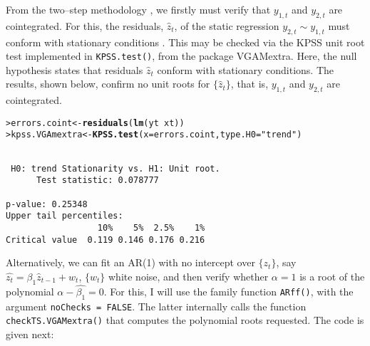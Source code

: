\documentclass[a4paper, 11pt]{article}\usepackage[]{graphicx}\usepackage[]{color}
\makeatletter
\newcommand{\hlstr}[1]{\textcolor[rgb]{0.192,0.494,0.8}{#1}}%
\newcommand{\hlopt}[1]{\textcolor[rgb]{0,0,0}{#1}}%
\newcommand{\hlstd}[1]{\textcolor[rgb]{0.345,0.345,0.345}{#1}}%
\newcommand{\hlkwb}[1]{\textcolor[rgb]{0.69,0.353,0.396}{#1}}%
\newcommand{\hlkwc}[1]{\textcolor[rgb]{0.333,0.667,0.333}{#1}}%
\newcommand{\hlkwd}[1]{\textcolor[rgb]{0.737,0.353,0.396}{\textbf{#1}}}%
\newenvironment{kframe}{%
 \def\at@end@of@kframe{}%
 \ifinner\ifhmode%
  \def\at@end@of@kframe{\end{minipage}}%
  \begin{minipage}{\columnwidth}%
 \fi\fi%
 \def\FrameCommand##1{\hskip\@totalleftmargin \hskip-\fboxsep
 \colorbox{shadecolor}{##1}\hskip-\fboxsep
     \hskip-\linewidth \hskip-\@totalleftmargin \hskip\columnwidth}%
 \MakeFramed {\advance\hsize-\width
   \@totalleftmargin\z@ \linewidth\hsize
   \@setminipage}}%
 {\par\unskip\endMakeFramed%
 \at@end@of@kframe}
\newenvironment{knitrout}{}{} %
\makeatother
\begin{document}
  \vspace{2mm}
 From the two--step methodology \citep{engl:gran:1987},
 we firstly must verify that
 $y_{1, t}$ and $y_{2, t}$ are cointegrated. For this,
the residuals, $\widehat{z}_t$, of the
static regression $y_{2, t} \sim y_{1, t}$ must conform with 
stationary conditions \citep{engl:gran:1987}. 
This may be checked via the KPSS unit root test
\citep{kpss:1991} implemented in
{\color{blue}\texttt{KPSS.test()}}, from the package
{\color{cyan}\textsf{VGAMextra}}.
Here, the null hypothesis
states that residuals $\widehat{z}_t$ conform with
stationary conditions.
The results, shown below, confirm no unit roots for
$\{ \widehat{z}_t \}$, that is,
$y_{1, t}$ and $y_{2, t}$ are cointegrated.





\begin{knitrout}\footnotesize
{}\color{fgcolor}\begin{kframe}
\begin{alltt}
\hlstd{> }    \hlstd{errors.coint}   \hlkwb{<-} \hlkwd{residuals}\hlstd{(}\hlkwd{lm}\hlstd{(yt} \hlopt{~} \hlstd{xt))}
\hlstd{> }    \hlstd{kpss.VGAmextra} \hlkwb{<-} \hlkwd{KPSS.test}\hlstd{(}\hlkwc{x} \hlstd{= errors.coint,} \hlkwc{type.H0} \hlstd{=} \hlstr{"trend"}\hlstd{)}
\end{alltt}
\begin{verbatim}

 H0: trend Stationarity vs. H1: Unit root. 
      Test statistic: 0.078777 

p-value: 0.25348
Upper tail percentiles:
                  10%    5%  2.5%    1%
Critical value  0.119 0.146 0.176 0.216
\end{verbatim}
\end{kframe}
\end{knitrout}



Alternatively, we can fit an AR(1) with no intercept over
$\{ \widehat{z_t}\}$, say $\widehat{z_t} = \beta_1 \widehat{z}_{t - 1} +
w_{t}$, $\{ w_t \}$ white noise, 
and then verify whether $\alpha = 1$ is a root of the
polynomial $\alpha - \widehat{\beta_1} = 0$.
For this, I will use the family function 
{\color{blue} \texttt{ARff()}}, with the argument
{\color{blue} \texttt{noChecks = FALSE}}. The latter internally calls
the function 
{\color{blue} \texttt{checkTS.VGAMextra()}} that computes the 
polynomial roots requested. The code is given next:
\end{document}
